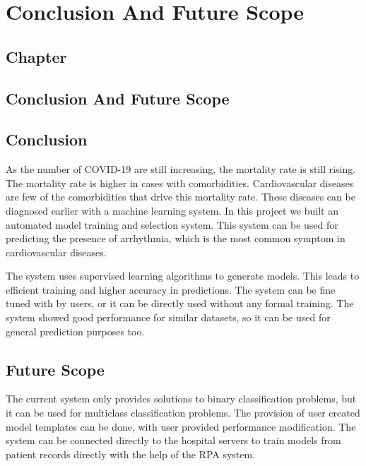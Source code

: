 \thispagestyle{fancy}
\chapter{Conclusion And Future Scope} \label{ch:conclusion_and_future_scope}
\section*{\centering Chapter \thechapter}
\section*{\centering Conclusion And Future Scope}


\section{Conclusion} \label{sec:conclusion}
As the number of COVID-19 are still increasing, the mortality rate is still rising. The
mortality rate is higher in cases with comorbidities. Cardiovascular diseases are few of the
comorbidities that drive this mortality rate. These diseases can be diagnosed earlier with a
machine learning system. In this project we built an automated model training and selection
system. This system can be used for predicting the presence of arrhythmia, which is the most
common symptom in cardiovascular diseases.

The system uses supervised learning algorithms to generate models. This leads to efficient
training and higher accuracy in predictions. The system can be fine tuned with by users, or it
can be directly used without any formal training. The system showed good performance for
similar datasets, so it can be used for general prediction purposes too.

\section{Future Scope} \label{sec:future_scope}
The current system only provides solutions to binary classification problems, but it can be
used for multiclass classification problems. The provision of user created model templates can
be done, with user provided performance modification. The system can be connected directly to
the hospital servers to train models from patient records directly with the help of the RPA
system.
